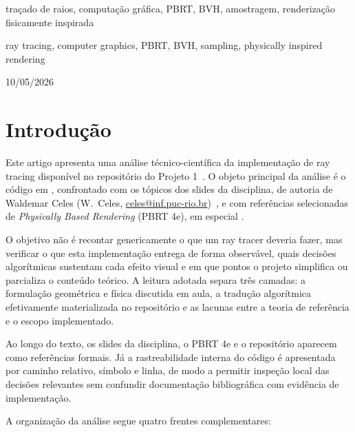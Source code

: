 \documentclass[portuguese]{sbcreviews-2025}%
\newcommand{\pbrtcontentsurl}{https://pbr-book.org/4ed/contents.html}
\newcommand{\pbrtbook}{\emph{Physically Based Rendering} (PBRT 4e)}
\newcommand{\pbrtsecs}[1]{\citep[\href{\pbrtcontentsurl}{Se\c{c}\~oes~#1}]{pharr2023pbrt}}
\begin{document}
\begin{frontmatter}
\begin{pchaves}
traçado de raios, computação gráfica, PBRT, BVH, amostragem, renderização fisicamente inspirada
\end{pchaves}

\begin{keywords}
ray tracing, computer graphics, PBRT, BVH, sampling, physically inspired rendering
\end{keywords}

\begin{dates}
 10/05/2026
\end{dates}

\end{frontmatter}
\section{Introdução}
\label{sec:escopo}

Este artigo apresenta uma análise técnico-científica da implementação de ray tracing disponível no repositório do Projeto 1~\citep{inf2608projectrepo}. O objeto principal da análise é o código em , confrontado com os tópicos dos slides da disciplina, de autoria de Waldemar Celes (W.~Celes, \href{mailto:celes@inf.puc-rio.br}{celes@inf.puc-rio.br})~\citep{inf2608slides04,inf2608slides05,inf2608slides06}, e com referências selecionadas de \pbrtbook, em especial \pbrtsecs{1.2, 3.5, 3.7, 5.2, 7.3, 8.1, 8.5, 9.3, 9.5, 11.2 e 12.4}.

O objetivo não é recontar genericamente o que um ray tracer deveria fazer, mas verificar o que esta implementação entrega de forma observável, quais decisões algorítmicas sustentam cada efeito visual e em que pontos o projeto simplifica ou parcializa o conteúdo teórico. A leitura adotada separa três camadas: a formulação geométrica e física discutida em aula, a tradução algorítmica efetivamente materializada no repositório e as lacunas entre a teoria de referência e o escopo implementado.

Ao longo do texto, os slides da disciplina, o PBRT 4e e o repositório aparecem como referências formais. Já a rastreabilidade interna do código é apresentada por caminho relativo, símbolo e linha, de modo a permitir inspeção local das decisões relevantes sem confundir documentação bibliográfica com evidência de implementação.

A organização da análise segue quatro frentes complementares:
\end{document}
